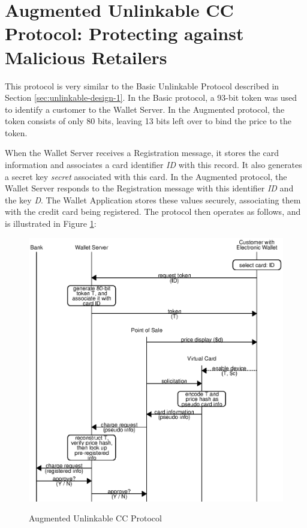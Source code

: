 \section{Augmented Unlinkable CC Protocol: Protecting against Malicious Retailers}
\label{sec:unlinkable-design-2}

This protocol is very similar to the Basic Unlinkable Protocol described in Section \ref{sec:unlinkable-design-1}.
In the Basic protocol, a 93-bit token was used to identify a customer to the Wallet Server.
In the Augmented protocol, the token consists of only 80 bits, leaving 13 bits left over to bind the price to the token.

When the Wallet Server receives a Registration message, it stores the card information and associates a card identifier \emph{ID} with this record.
It also generates a secret key \emph{secret} associated with this card.
In the Augmented protocol, the Wallet Server responds to the Registration message with this identifier \emph{ID} and the key \emph{D}.
The Wallet Application stores these values securely, associating them with the credit card being registered.
The protocol then operates as follows, and is illustrated in Figure \ref{fig:unlinkable-2}:

\begin{figure}[h!]
  \caption{Augmented Unlinkable CC Protocol}
  \centering
    \includegraphics{img/unlinkable-2.eps}
  \label{fig:unlinkable-2}
\end{figure}

